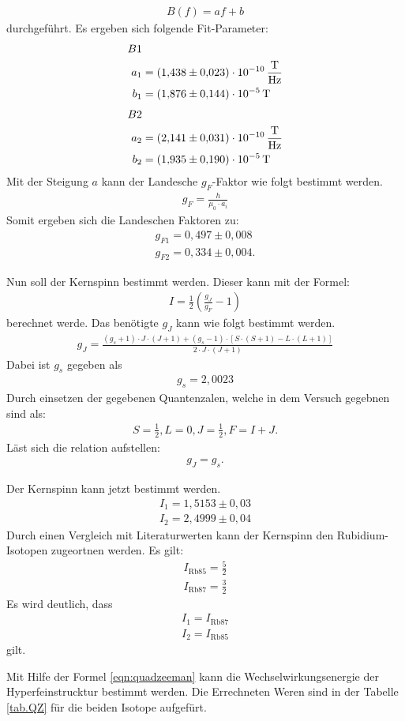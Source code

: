 \begin{align*}
  B(f)=af+b
\end{align*}
durchgeführt.
Es ergeben sich folgende Fit-Parameter:
\begin{align*}
  B1&\\
  a_1&=\SI{1.438\pm 0.023e-10}{\frac{T}{Hz}}\\
  b_1&=\SI{1.876\pm 0.144e-5}{T}
\end{align*}
\begin{align*}
  B2&\\
  a_2&=\SI{2.141\pm0.031e-10}{\frac{T}{Hz}}\\
  b_2&=\SI{1.935\pm0.190e-5}{T}
\end{align*}
\FloatBarrier
Mit der Steigung $a$ kann der Landesche $g_F$-Faktor wie folgt bestimmt werden.
\begin{align*}
  g_F = \frac{h}{\mu_0\cdot a_i}
\end{align*}
Somit ergeben sich die Landeschen Faktoren zu:
\begin{align*}
  g_{F1} = 0,497\pm0,008\\
  g_{F2} = 0,334\pm0,004.
\end{align*}

Nun soll der Kernspinn bestimmt werden.
Dieser kann mit der Formel:
\begin{align*}
  I = \frac{1}{2}\left(\frac{g_J}{g_F}-1\right)
\end{align*}
berechnet werde.
Das benötigte $g_J$ kann wie folgt bestimmt werden.
\begin{align*}
  g_J = \frac{(g_s+1)\cdot J\cdot(J+1)+(g_s-1)\cdot[S\cdot (S+1)-L\cdot (L+1)]}{2\cdot J \cdot (J+1)}
\end{align*}
Dabei ist $g_s$ gegeben als
\begin{align*}
  g_s = 2,0023
\end{align*}
Durch einsetzen der gegebenen Quantenzalen, welche in dem Versuch gegebnen sind als:
\begin{align*}
  S = \frac{1}{2}, L=0, J=\frac{1}{2}, F = I+J.
\end{align*}
Läst sich die relation aufstellen:
\begin{align*}
  g_J=g_s.
\end{align*}

Der Kernspinn kann jetzt bestimmt werden.
\begin{align*}
  I_1=1,5153\pm0,03\\
  I_2=2,4999\pm0,04
\end{align*}
Durch einen Vergleich mit Literaturwerten kann der Kernspinn den Rubidium-Isotopen zugeortnen werden.
Es gilt:
\begin{align*}
  I_{\text{Rb85}}=\frac{5}{2}\\
  I_{\text{Rb87}}=\frac{3}{2}
\end{align*}
Es wird deutlich, dass
\begin{align*}
  I_1=I_{\text{Rb87}}\\
  I_2=I_{\text{Rb85}}
\end{align*}
gilt.

Mit Hilfe der Formel \ref{eqn:quadzeeman} kann die Wechselwirkungsenergie der Hyperfeinstrucktur bestimmt werden.
Die Errechneten Weren sind in der Tabelle \ref{tab.QZ} für die beiden Isotope aufgefürt.

